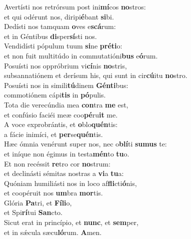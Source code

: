 \evenverse Avertísti nos retrórsum post ini\textbf{mí}cos \textbf{no}stros:~\*\\
\evenverse et qui odérunt nos, diripi\textbf{é}bant \textbf{si}bi.\\
\oddverse Dedísti nos tamquam \textbf{o}ves e\textbf{scá}rum:~\*\\
\oddverse et in Géntibus \textbf{di}sper\textbf{sí}sti nos.\\
\evenverse Vendidísti pópulum tuum \textbf{si}ne \textbf{pré}\textbf{ti}o:~\*\\
\evenverse et non fuit multitúdo in commutatióni\textbf{bus} e\textbf{ó}rum.\\
\oddverse Posuísti nos oppróbrium vi\textbf{cí}nis \textbf{no}stris,~\*\\
\oddverse subsannatiónem et derísum his, qui sunt in cir\textbf{cú}itu \textbf{no}stro.\\
\evenverse Posuísti nos in simili\textbf{tú}dinem \textbf{Gén}\textbf{ti}bus:~\*\\
\evenverse commotiónem cápi\textbf{tis} in \textbf{pó}pulis.\\
\oddverse Tota die verecúndia mea \textbf{con}tra \textbf{me} est,~\*\\
\oddverse et confúsio faciéi meæ coo\textbf{pé}ru\textbf{it} me.\\
\evenverse A voce exprobrántis, et \textbf{o}blo\textbf{quén}tis:~\*\\
\evenverse a fácie inimíci, et \textbf{per}se\textbf{quén}tis.\\
\oddverse Hæc ómnia venérunt super nos, nec o\textbf{blí}ti \textbf{su}\textbf{mus} te:~\*\\
\oddverse et iníque non égimus in testa\textbf{mén}to \textbf{tu}o.\\
\evenverse Et non recéssit \textbf{re}tro cor \textbf{no}strum:~\*\\
\evenverse et declinásti sémitas nostras a \textbf{vi}a \textbf{tu}a:\\
\oddverse Quóniam humiliásti nos in loco af\textbf{fli}cti\textbf{ó}nis,~\*\\
\oddverse et coopéruit nos \textbf{um}bra \textbf{mor}tis.\\
\evenverse Glória \textbf{Pa}tri, et \textbf{Fí}\textbf{li}o,~\*\\
\evenverse et Spi\textbf{rí}tui \textbf{San}cto.\\
\oddverse Sicut erat in princípio, et \textbf{nunc}, et \textbf{sem}per,~\*\\
\oddverse et in sǽcula sæcu\textbf{ló}rum. \textbf{A}men.\\
